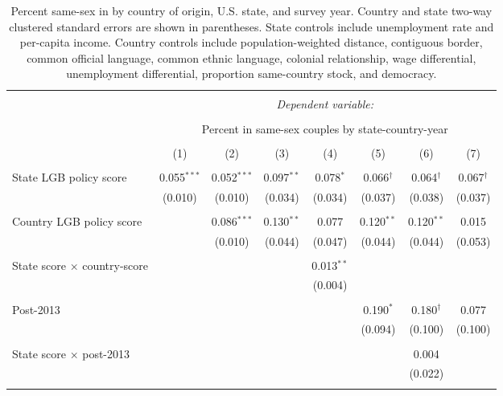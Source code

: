 \documentclass[
  11pt,
]{article}
\begin{document}
\begin{table}[!htbp] \centering 
  \caption{Percent same-sex in by country of origin, U.S. state, and survey year. Country and state two-way clustered standard errors are shown in parentheses. State controls include unemployment rate and per-capita income. Country controls include population-weighted distance, contiguous border, common official language, common ethnic language, colonial relationship, wage differential, unemployment differential, proportion same-country stock, and democracy.} 
  \label{tab:state-props} 
\begin{tabular}{@{\extracolsep{5pt}}lccccccc} 
\\[-1.8ex]\hline 
\hline \\[-1.8ex] 
 & \multicolumn{7}{c}{\textit{Dependent variable:}} \\ 
\cline{2-8} 
\\[-1.8ex] & \multicolumn{7}{c}{Percent in same-sex couples by state-country-year} \\ 
\\[-1.8ex] & (1) & (2) & (3) & (4) & (5) & (6) & (7)\\ 
\hline \\[-1.8ex] 
 State LGB policy score & 0.055$^{***}$ & 0.052$^{***}$ & 0.097$^{**}$ & 0.078$^{*}$ & 0.066$^{†}$ & 0.064$^{†}$ & 0.067$^{†}$ \\ 
  & (0.010) & (0.010) & (0.034) & (0.034) & (0.037) & (0.038) & (0.037) \\ 
  & & & & & & & \\ 
 Country LGB policy score &  & 0.086$^{***}$ & 0.130$^{**}$ & 0.077 & 0.120$^{**}$ & 0.120$^{**}$ & 0.015 \\ 
  &  & (0.010) & (0.044) & (0.047) & (0.044) & (0.044) & (0.053) \\ 
  & & & & & & & \\ 
 State score × country-score &  &  &  & 0.013$^{**}$ &  &  &  \\ 
  &  &  &  & (0.004) &  &  &  \\ 
  & & & & & & & \\ 
 Post-2013 &  &  &  &  & 0.190$^{*}$ & 0.180$^{†}$ & 0.077 \\ 
  &  &  &  &  & (0.094) & (0.100) & (0.100) \\ 
  & & & & & & & \\ 
 State score × post-2013 &  &  &  &  &  & 0.004 &  \\ 
  &  &  &  &  &  & (0.022) &  \\ 
  & & & & & & & \\ 

\end{tabular}
\end{table}
\end{document}
